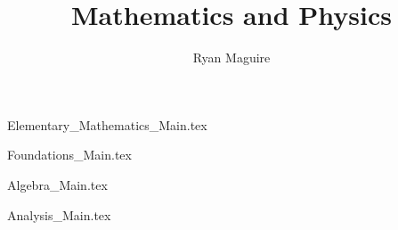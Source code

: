 \documentclass[oneside]{book}
\title{Mathematics and Physics}
\author{Ryan Maguire}
\date{\vspace{-5ex}}
\begin{document}
    \maketitle
    \tableofcontents
    \listoffigures
    \listoftables
    \clearpage
    \newif\ifmain
        
               {Elementary_Mathematics_Main.tex}


        {Foundations_Main.tex}

        {Algebra_Main.tex}
    
        {Analysis_Main.tex}
%
%
%
%
%        
%

    
\end{document}
